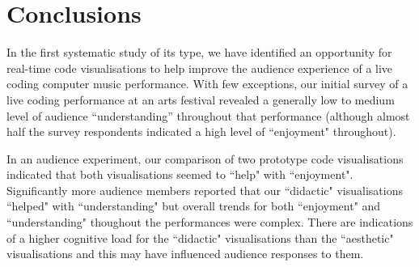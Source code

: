 \documentclass{sig-alternate}
\begin{document}

\section{Conclusions}

In the first systematic study of its type, we have identified an opportunity for real-time code visualisations to help improve the audience experience of a live coding computer music performance. With few exceptions, our initial survey of a live coding performance at an arts festival revealed a generally low to medium level of audience ``understanding'' throughout that performance (although almost half the survey respondents indicated a high level of ``enjoyment" throughout).

In an audience experiment, our comparison of two prototype code visualisations indicated that both visualisations seemed to ``help" with ``enjoyment". Significantly more audience members reported that our ``didactic" visualisations ``helped" with ``understanding" but overall trends for both ``enjoyment" and ``understanding" thoughout the performances were complex. There are indications of a higher cognitive load for the ``didactic" visualisations than the ``aesthetic" visualisations and this may have influenced audience responses to them. 




\end{document}
